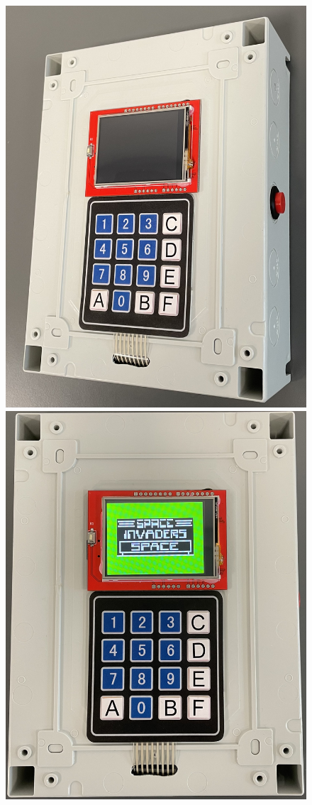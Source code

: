 \documentclass[a4paper]{article}
\begin{document}
\begin{figure}[h!t]
\begin{center}
        \includegraphics[scale=0.268]{./figures/end2.jpg}
        \includegraphics[scale=0.244]{./figures/end3.jpg}

\end{center}
\end{figure}
\end{document}
